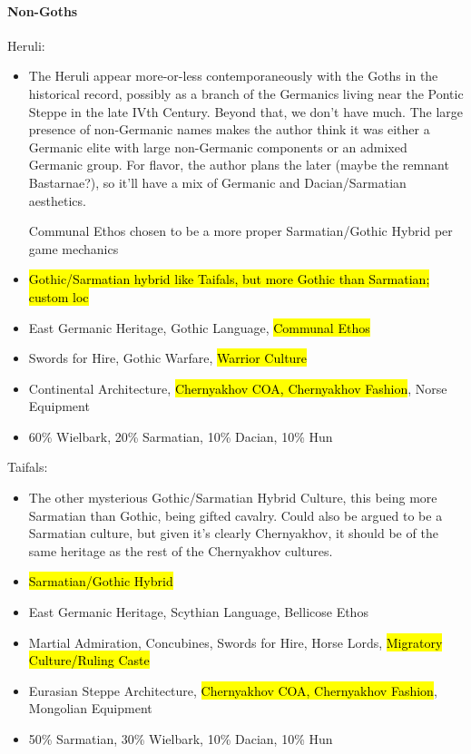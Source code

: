 \documentclass{article}
\begin{document}
	\paragraph{Non-Goths}
	Heruli:
	\begin{itemize}
		\item The Heruli appear more-or-less contemporaneously with the Goths in the historical record, possibly as a branch of the Germanics living near the Pontic Steppe in the late IVth Century.
		Beyond that, we don’t have much.
		The large presence of non-Germanic names \cite{OdoacerGermanOrHun} makes the author think it was either a Germanic elite with large non-Germanic components or an admixed Germanic group.
		For flavor, the author plans the later (maybe the remnant Bastarnae?), so it’ll have a mix of Germanic and Dacian/Sarmatian aesthetics.
		
		Communal Ethos chosen to be a more proper Sarmatian/Gothic Hybrid per game mechanics
		\item \hl{Gothic/Sarmatian hybrid like Taifals, but more Gothic than Sarmatian; custom loc}
		\item East Germanic Heritage, Gothic Language, \hl{Communal Ethos}
		\item Swords for Hire, Gothic Warfare, \hl{Warrior Culture}
		\item Continental Architecture, \hl{Chernyakhov COA, Chernyakhov Fashion}, Norse Equipment
		\item 60\% Wielbark, 20\% Sarmatian, 10\% Dacian, 10\% Hun
	\end{itemize}
	
	Taifals:
	\begin{itemize}
		\item The other mysterious Gothic/Sarmatian Hybrid Culture, this being more Sarmatian than Gothic, being gifted cavalry.
		Could also be argued to be a Sarmatian culture, but given it's clearly Chernyakhov, it should be of the same heritage as the rest of the Chernyakhov cultures.
		\item \hl{Sarmatian/Gothic Hybrid}
		\item East Germanic Heritage, Scythian Language, Bellicose Ethos
		\item Martial Admiration, Concubines, Swords for Hire, Horse Lords, \hl{Migratory Culture/Ruling Caste}
		\item Eurasian Steppe Architecture, \hl{Chernyakhov COA, Chernyakhov Fashion}, Mongolian Equipment
		\item 50\% Sarmatian, 30\% Wielbark, 10\% Dacian, 10\% Hun
	\end{itemize}
	
\end{document}
